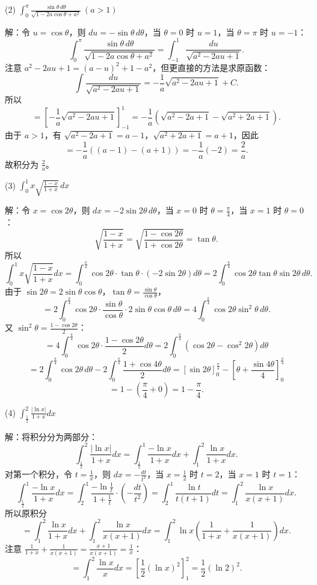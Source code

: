 (2) \(\int_{0}^{\pi}\frac{\sin\theta\,d\theta}{\sqrt{1-2a\cos\theta+a^{2}}}\ (a>1)\)

解：令 \(u=\cos\theta\)，则 \(du=-\sin\theta\,d\theta\)，当 \(\theta=0\) 时 \(u=1\)，当 \(\theta=\pi\) 时 \(u=-1\)：
\[ \int_{0}^{\pi}\frac{\sin\theta\,d\theta}{\sqrt{1-2a\cos\theta+a^{2}}}=\int_{-1}^{1}\frac{du}{\sqrt{a^{2}-2au+1}}. \]
注意 \(a^{2}-2au+1=(a-u)^{2}+1-a^{2}\)，但更直接的方法是求原函数：
\[ \int\frac{du}{\sqrt{a^{2}-2au+1}}=-\frac{1}{a}\sqrt{a^{2}-2au+1}+C. \]
所以
\[ =\left[-\frac{1}{a}\sqrt{a^{2}-2au+1}\right]_{-1}^{1}=-\frac{1}{a}\left(\sqrt{a^{2}-2a+1}-\sqrt{a^{2}+2a+1}\right). \]
由于 \(a>1\)，有 \(\sqrt{a^{2}-2a+1}=a-1\)，\(\sqrt{a^{2}+2a+1}=a+1\)，因此
\[ =-\frac{1}{a}\left((a-1)-(a+1)\right)=-\frac{1}{a}(-2)=\frac{2}{a}. \]
故积分为 \(\frac{2}{a}\)。

(3) \(\int_{0}^{1}x\sqrt{\frac{1-x}{1+x}}\,dx\)

解：令 \(x=\cos2\theta\)，则 \(dx=-2\sin2\theta\,d\theta\)，当 \(x=0\) 时 \(\theta=\frac{\pi}{4}\)，当 \(x=1\) 时 \(\theta=0\)：
\[ \sqrt{\frac{1-x}{1+x}}=\sqrt{\frac{1-\cos2\theta}{1+\cos2\theta}}=\tan\theta. \]
所以
\[ \int_{0}^{1}x\sqrt{\frac{1-x}{1+x}}dx=\int_{0}^{\frac{\pi}{4}}\cos2\theta\cdot\tan\theta\cdot(-2\sin2\theta)d\theta=2\int_{0}^{\frac{\pi}{4}}\cos2\theta\tan\theta\sin2\theta\,d\theta. \]
由于 \(\sin2\theta=2\sin\theta\cos\theta\)，\(\tan\theta=\frac{\sin\theta}{\cos\theta}\)，
\[ =2\int_{0}^{\frac{\pi}{4}}\cos2\theta\cdot\frac{\sin\theta}{\cos\theta}\cdot2\sin\theta\cos\theta\,d\theta=4\int_{0}^{\frac{\pi}{4}}\cos2\theta\sin^{2}\theta\,d\theta. \]
又 \(\sin^{2}\theta=\frac{1-\cos2\theta}{2}\)：
\[ =4\int_{0}^{\frac{\pi}{4}}\cos2\theta\cdot\frac{1-\cos2\theta}{2}d\theta=2\int_{0}^{\frac{\pi}{4}}(\cos2\theta-\cos^{2}2\theta)d\theta \]
\[ =2\int_{0}^{\frac{\pi}{4}}\cos2\theta\,d\theta-2\int_{0}^{\frac{\pi}{4}}\frac{1+\cos4\theta}{2}d\theta=\left[\sin2\theta\right]_{0}^{\frac{\pi}{4}}-\left[\theta+\frac{\sin4\theta}{4}\right]_{0}^{\frac{\pi}{4}} \]
\[ =1-\left(\frac{\pi}{4}+0\right)=1-\frac{\pi}{4}. \]

(4) \(\int_{\frac{1}{2}}^{2}\frac{|\ln x|}{1+x}dx\)

解：将积分分为两部分：
\[ \int_{\frac{1}{2}}^{2}\frac{|\ln x|}{1+x}dx=\int_{\frac{1}{2}}^{1}\frac{-\ln x}{1+x}dx+\int_{1}^{2}\frac{\ln x}{1+x}dx. \]
对第一个积分，令 \(t=\frac{1}{x}\)，则 \(dx=-\frac{dt}{t^{2}}\)，当 \(x=\frac{1}{2}\) 时 \(t=2\)，当 \(x=1\) 时 \(t=1\)：
\[ \int_{\frac{1}{2}}^{1}\frac{-\ln x}{1+x}dx=\int_{2}^{1}\frac{-\ln\frac{1}{t}}{1+\frac{1}{t}}\cdot\left(-\frac{dt}{t^{2}}\right)=\int_{2}^{1}\frac{\ln t}{t(t+1)}dt=\int_{1}^{2}\frac{\ln x}{x(x+1)}dx. \]
所以原积分
\[ =\int_{1}^{2}\frac{\ln x}{1+x}dx+\int_{1}^{2}\frac{\ln x}{x(x+1)}dx=\int_{1}^{2}\ln x\left(\frac{1}{1+x}+\frac{1}{x(x+1)}\right)dx. \]
注意 \(\frac{1}{1+x}+\frac{1}{x(x+1)}=\frac{x+1}{x(x+1)}=\frac{1}{x}\)：
\[ =\int_{1}^{2}\frac{\ln x}{x}dx=\left[\frac{1}{2}(\ln x)^{2}\right]_{1}^{2}=\frac{1}{2}(\ln2)^{2}. \]


